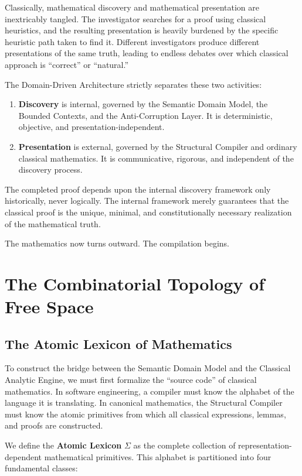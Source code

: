 \documentclass[12pt,openany]{extbook}
\theoremstyle{plain}
\theoremstyle{definition}
\begin{document}
Classically, mathematical discovery and mathematical presentation are inextricably tangled. The investigator searches for a proof using classical heuristics, and the resulting presentation is heavily burdened by the specific heuristic path taken to find it. Different investigators produce different presentations of the same truth, leading to endless debates over which classical approach is ``correct'' or ``natural.'' 

The Domain-Driven Architecture strictly separates these two activities:
\begin{enumerate}
    \item \textbf{Discovery} is internal, governed by the Semantic Domain Model, the Bounded Contexts, and the Anti-Corruption Layer. It is deterministic, objective, and presentation-independent.
    \item \textbf{Presentation} is external, governed by the Structural Compiler and ordinary classical mathematics. It is communicative, rigorous, and independent of the discovery process.
\end{enumerate}

The completed proof depends upon the internal discovery framework only historically, never logically. The internal framework merely guarantees that the classical proof is the unique, minimal, and constitutionally necessary realization of the mathematical truth.

The mathematics now turns outward. The compilation begins.

\chapter{The Combinatorial Topology of Free Space}

\section{The Atomic Lexicon of Mathematics}

To construct the bridge between the Semantic Domain Model and the Classical Analytic Engine, we must first formalize the ``source code'' of classical mathematics. In software engineering, a compiler must know the alphabet of the language it is translating. In canonical mathematics, the Structural Compiler must know the atomic primitives from which all classical expressions, lemmas, and proofs are constructed.

We define the \textbf{Atomic Lexicon} $\Sigma$ as the complete collection of representation-dependent mathematical primitives. This alphabet is partitioned into four fundamental classes:
\end{document}
